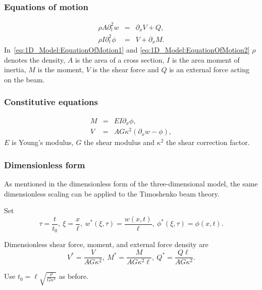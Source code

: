 		\subsubsection*{Equations of motion}\label{sssec:1D_Model:EquationOfMotion}
			\begin{eqnarray}
				\rho A \partial_t^2 w &=& \partial_x V + Q, \label{eq:1D_Model:EquationOfMotion1}\\
				\rho I\partial_t^2 \phi  &=& V + \partial_x M. \label{eq:1D_Model:EquationOfMotion2}
			\end{eqnarray}\label{sym:A}\label{sym:V}\label{sym:Iinertia}\label{sym:M}\label{sym:phiT}
			In~\eqref{eq:1D_Model:EquationOfMotion1} and \eqref{eq:1D_Model:EquationOfMotion2} $\rho$ denotes the density, $A$ is the area of a cross section, $I$ is the area moment of inertia, $M$ is the moment, $V$ is the shear force and $Q$ is an external force acting on the beam.

		\subsubsection*{Constitutive equations}\label{sssec:1D_Model:ConstitutiveEquation}
			\begin{eqnarray}
				M &=& EI\partial_x \phi, \label{eq:1D_Model:ConstitutiveEquations1}\\
				V &=& AG\kappa^2(\partial_x w - \phi), \label{eq:1D_Model:ConstitutiveEquations2}\label{sym:kappa2T}
			\end{eqnarray}
			$E$ is Young's modulus, $G$ the shear modulus and $\kappa^2$ the shear correction factor.

		\subsubsection*{Dimensionless form}\label{sssec:1D_Model:DimensionlessForm}
			As mentioned in the dimensionless form of the three-dimensional model, the same dimensionless scaling can be applied to the Timoshenko beam theory.

			Set \[\tau = \frac{t}{t_0},\ \xi = \frac{x}{\ell},\ w^*(\xi,\tau) = \frac{w(x,t)}{\ell},\ \phi^*(\xi, \tau) = \phi(x,t).\]

			Dimensionless shear force, moment, and external force density are \[V^{*} = \frac{V}{AG\kappa^2},\ M^{*} = \frac{M}{A G\kappa^2 \ell},\ Q^* = \frac{Q\ell}{A G\kappa^2}.\]

			Use $\displaystyle t_0 = \ell\sqrt{\frac{\rho}{G\kappa^2}}$ as before.

